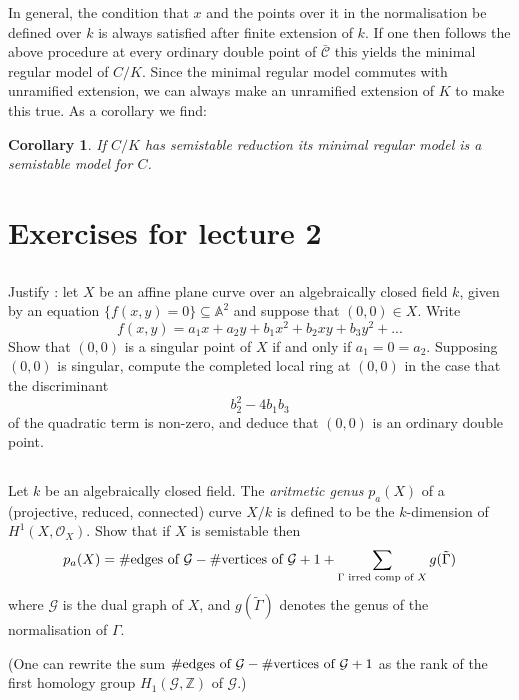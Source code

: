 \documentclass[12pt]{amsart}
\numberwithin{equation}{section}
\newtheorem{cor}[equation]{Corollary}
\theoremstyle{remark}
\theoremstyle{definition}
\theoremstyle{definition}
\theoremstyle{definition}
\theoremstyle{definition}
\theoremstyle{definition}
\theoremstyle{definition}
\begin{document}
In general, the condition that $x$ and the points over it in the normalisation be defined over $k$ is always satisfied after finite extension of $k$. If one then follows the above procedure  at every ordinary double point of $\bar{\mathcal{C}}$ this yields the minimal regular model of $C/K$.  Since the minimal regular model commutes with unramified extension, we can always make an unramified extension of $K$ to make this true. As a corollary we find:

\begin{cor}
If $C/K$ has semistable reduction its minimal regular model is a semistable model for $C$.
\end{cor} 

\newpage

\section{Exercises for lecture 2}


\subsection{}
Justify : let $X$ be an affine plane curve over an algebraically closed field $k$, given by an equation $\{f(x,y)=0\}\subseteq \mathbb{A}^2$ and suppose that $(0,0)\in X$. Write 
\[f(x,y)=a_1x+a_2y+b_1x^2+b_2xy+b_3y^2+...\]
Show that $(0,0)$ is a singular point of $X$ if and only if $a_1=0=a_2$. Supposing $(0,0)$ is singular, compute the completed local ring at $(0,0)$ in the case that the discriminant
\[b_2^2-4b_1b_3\]
of the quadratic term is non-zero, and deduce that $(0,0)$ is an ordinary double point. 

\subsection{}
Let $k$ be an algebraically closed field. The \textit{aritmetic genus} $p_a(X)$ of a (projective, reduced, connected) curve $X/k$ is defined to be the $k$-dimension of $H^1(X,\mathcal{O}_X)$. Show that if $X$ is semistable then 
\[p_a(X)=\#\textup{edges of }\mathcal{G}-\# \textup{vertices of }\mathcal{G}+1+\sum_{\Gamma \textup{ irred comp of }X} g(\tilde{\Gamma})\]
where $\mathcal{G}$ is the dual graph of $X$, and $g(\tilde{\Gamma})$ denotes the  genus of the normalisation of $\Gamma$. 

(One can rewrite the sum $\#\textup{edges of }\mathcal{G}-\# \textup{vertices of }\mathcal{G}+1$ as the rank of the first homology group
$H_1(\mathcal{G},\mathbb{Z})$ of $\mathcal{G}$.)
\end{document}
